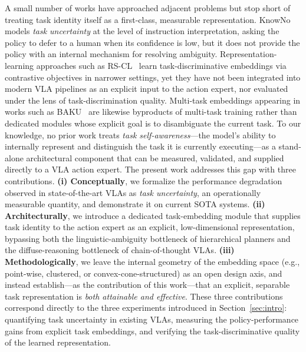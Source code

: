 \documentclass[11pt]{article}
\begin{document}
A small number of works have approached adjacent problems but stop short of treating task identity itself as a first-class, measurable representation. KnowNo~\cite{knowno} models \emph{task uncertainty} at the level of instruction interpretation, asking the policy to defer to a human when its confidence is low, but it does not provide the policy with an internal mechanism for resolving ambiguity. Representation-learning approaches such as RS-CL~\cite{rscl} learn task-discriminative embeddings via contrastive objectives in narrower settings, yet they have not been integrated into modern VLA pipelines as an explicit input to the action expert, nor evaluated under the lens of task-discrimination quality. Multi-task embeddings appearing in works such as BAKU~\cite{baku} are likewise byproducts of multi-task training rather than dedicated modules whose explicit goal is to disambiguate the current task. To our knowledge, no prior work treats \emph{task self-awareness}---the model's ability to internally represent and distinguish the task it is currently executing---as a stand-alone architectural component that can be measured, validated, and supplied directly to a VLA action expert. The present work addresses this gap with three contributions. \textbf{(i) Conceptually}, we formalize the performance degradation observed in state-of-the-art VLAs as \emph{task uncertainty}, an operationally measurable quantity, and demonstrate it on current SOTA systems. \textbf{(ii) Architecturally}, we introduce a dedicated task-embedding module that supplies task identity to the action expert as an explicit, low-dimensional representation, bypassing both the linguistic-ambiguity bottleneck of hierarchical planners and the diffuse-reasoning bottleneck of chain-of-thought VLAs. \textbf{(iii) Methodologically}, we leave the internal geometry of the embedding space (e.g., point-wise, clustered, or convex-cone-structured) as an open design axis, and instead establish---as the contribution of this work---that an explicit, separable task representation is \emph{both attainable and effective}. These three contributions correspond directly to the three experiments introduced in Section~\ref{sec:intro}: quantifying task uncertainty in existing VLAs, measuring the policy-performance gains from explicit task embeddings, and verifying the task-discriminative quality of the learned representation.

%
\end{document}
